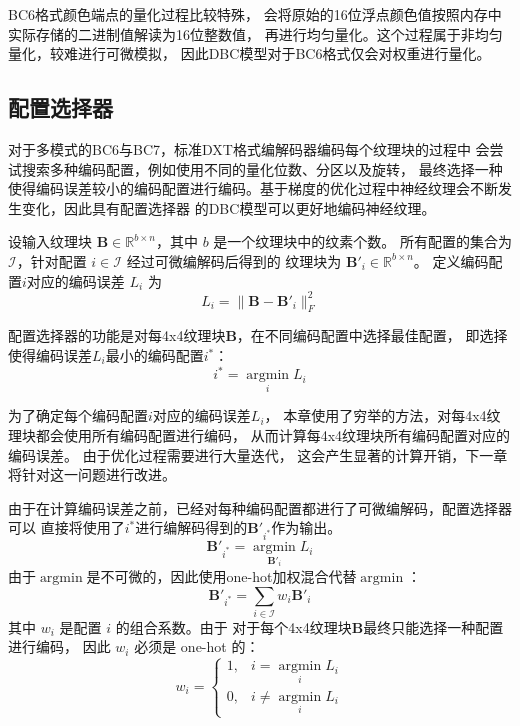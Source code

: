 BC6格式颜色端点的量化过程比较特殊，
会将原始的16位浮点颜色值按照内存中实际存储的二进制值解读为16位整数值，
再进行均匀量化。这个过程属于非均匀量化，较难进行可微模拟，
因此DBC模型对于BC6格式仅会对权重进行量化。

\subsection{配置选择器}

对于多模式的BC6与BC7，标准DXT格式编解码器编码每个纹理块的过程中
会尝试搜索多种编码配置，例如使用不同的量化位数、分区以及旋转，
最终选择一种使得编码误差较小的编码配置进行编码。基于梯度的优化过程中神经纹理会不断发生变化，因此具有配置选择器
的DBC模型可以更好地编码神经纹理。

设输入纹理块 $\mathbf{B}\in\mathbb{R}^{b\times n}$，其中 $b$ 是一个纹理块中的纹素个数。
所有配置的集合为 $\mathcal{I}$，针对配置 $i\in\mathcal{I}$ 经过可微编解码后得到的
纹理块为 $\mathbf{B}'_i\in\mathbb{R}^{b\times n}$。
定义编码配置$i$对应的编码误差 $L_i$ 为
\begin{equation}
L_i=\|\mathbf{B}-\mathbf{B}'_i\|_F^2
\end{equation}

配置选择器的功能是对每4x4纹理块$\mathbf{B}$，在不同编码配置中选择最佳配置，
即选择使得编码误差$L_i$最小的编码配置$i^*$：
\begin{equation}
    i^*=\mathop{\arg\min}\limits_{i} L_i
\end{equation}

为了确定每个编码配置$i$对应的编码误差$L_i$，
本章使用了穷举的方法，对每4x4纹理块都会使用所有编码配置进行编码，
从而计算每4x4纹理块所有编码配置对应的编码误差。
由于优化过程需要进行大量迭代，
这会产生显著的计算开销，下一章将针对这一问题进行改进。

由于在计算编码误差之前，已经对每种编码配置都进行了可微编解码，配置选择器可以
直接将使用了$i^*$进行编解码得到的$\mathbf{B}'_{i^*}$作为输出。
\begin{equation}
    \mathbf{B}'_{i^*}=\mathop{\arg\min}\limits_{\mathbf{B}'_i} L_i
\end{equation}
由于$\mathop{\arg\min}$是不可微的，因此使用one-hot加权混合代替$\mathop{\arg\min}$：
\begin{equation}
\mathbf{B}'_{i^*}=\sum_{i\in\mathcal{I}} w_i\mathbf{B}'_i
\end{equation}
其中 $w_i$ 是配置 $i$ 的组合系数。由于
对于每个4x4纹理块$\mathbf{B}$最终只能选择一种配置进行编码，
因此 $w_i$ 必须是 one-hot 的：
\begin{equation}
    w_i =\left\{\begin{matrix}
        1,& i=\mathop{\arg\min}\limits_{i} L_i
        \\0,& i\ne\mathop{\arg\min}\limits_{i} L_i
        \end{matrix}\right.
\end{equation}

